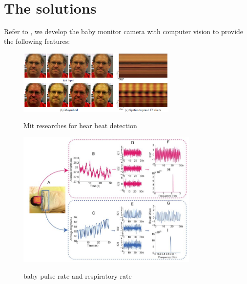 \documentclass[a4paper,10pt]{report}
\begin{document}
\section {The solutions}
\label {TheSolutions}
Refer to \cite{Poh2011Advancements}\cite{Wu12Eulerian}, we develop the baby monitor camera
with computer vision to provide the following features:
\begin{figure}[h]
  \centering
	\includegraphics[width=0.7\textwidth, keepaspectratio=true]{mit-vidmag-teaser}
  \caption{Mit researches for hear beat detection}\cite{Wu12Eulerian}\cite{midvidmag-youtube}
  \label{fig:mit-vidmag}
\end{figure}

\begin{figure}[h]
  \centering
	\includegraphics[width=0.8\textwidth, keepaspectratio=true]{baby-pr}
  \caption{baby pulse rate and respiratory rate}\cite{Hao-Yu-2013}
  \label{fig:baby-pr}
\end{figure}
\end{document}
